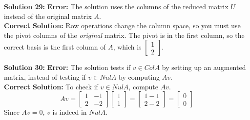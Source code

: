 \documentclass[11pt]{article}
\begin{document}
\vspace{0.3cm}
\textbf{Solution 29:} \textbf{Error:} The solution uses the columns of the reduced matrix $U$ instead of the original matrix $A$. \\
\textbf{Correct Solution:} Row operations change the column space, so you must use the pivot columns of the \textit{original} matrix. The pivot is in the first column, so the correct basis is the first column of $A$, which is $\begin{bmatrix} 1 \\ 2 \end{bmatrix}$.

\vspace{0.3cm}
\textbf{Solution 30:} \textbf{Error:} The solution tests if $v \in Col A$ by setting up an augmented matrix, instead of testing if $v \in Nul A$ by computing $Av$. \\
\textbf{Correct Solution:} To check if $v \in Nul A$, compute $Av$.
$$ Av = \begin{bmatrix} 1 & -1 \\ 2 & -2 \end{bmatrix} \begin{bmatrix} 1 \\ 1 \end{bmatrix} = \begin{bmatrix} 1 - 1 \\ 2 - 2 \end{bmatrix} = \begin{bmatrix} 0 \\ 0 \end{bmatrix} $$
Since $Av = 0$, $v$ is indeed in $Nul A$.
\end{document}
